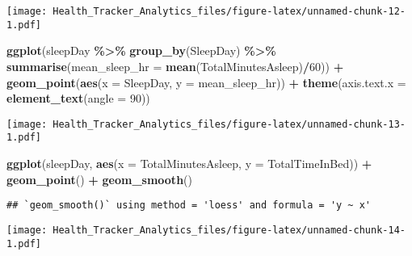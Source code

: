 \documentclass[
]{article}
\newenvironment{Shaded}{\begin{snugshade}}{\end{snugshade}}
\newcommand{\AttributeTok}[1]{\textcolor[rgb]{0.13,0.29,0.53}{#1}}
\newcommand{\DecValTok}[1]{\textcolor[rgb]{0.00,0.00,0.81}{#1}}
\newcommand{\FunctionTok}[1]{\textcolor[rgb]{0.13,0.29,0.53}{\textbf{#1}}}
\newcommand{\NormalTok}[1]{#1}
\newcommand{\SpecialCharTok}[1]{\textcolor[rgb]{0.81,0.36,0.00}{\textbf{#1}}}
\begin{document}
\texttt{[image: Health\_Tracker\_Analytics\_files/figure-latex/unnamed-chunk-12-1.pdf]}

\begin{Shaded}
\begin{Highlighting}[]
\FunctionTok{ggplot}\NormalTok{(sleepDay }\SpecialCharTok{\%\textgreater{}\%} \FunctionTok{group\_by}\NormalTok{(SleepDay) }\SpecialCharTok{\%\textgreater{}\%} \FunctionTok{summarise}\NormalTok{(}\AttributeTok{mean\_sleep\_hr =} \FunctionTok{mean}\NormalTok{(TotalMinutesAsleep)}\SpecialCharTok{/}\DecValTok{60}\NormalTok{)) }\SpecialCharTok{+} 
  \FunctionTok{geom\_point}\NormalTok{(}\FunctionTok{aes}\NormalTok{(}\AttributeTok{x =}\NormalTok{ SleepDay, }\AttributeTok{y =}\NormalTok{ mean\_sleep\_hr)) }\SpecialCharTok{+} 
  \FunctionTok{theme}\NormalTok{(}\AttributeTok{axis.text.x =} \FunctionTok{element\_text}\NormalTok{(}\AttributeTok{angle =} \DecValTok{90}\NormalTok{))}
\end{Highlighting}
\end{Shaded}

\texttt{[image: Health\_Tracker\_Analytics\_files/figure-latex/unnamed-chunk-13-1.pdf]}

\begin{Shaded}
\begin{Highlighting}[]
\FunctionTok{ggplot}\NormalTok{(sleepDay, }\FunctionTok{aes}\NormalTok{(}\AttributeTok{x =}\NormalTok{ TotalMinutesAsleep, }\AttributeTok{y =}\NormalTok{ TotalTimeInBed)) }\SpecialCharTok{+} 
  \FunctionTok{geom\_point}\NormalTok{() }\SpecialCharTok{+} \FunctionTok{geom\_smooth}\NormalTok{()}
\end{Highlighting}
\end{Shaded}

\begin{verbatim}
## `geom_smooth()` using method = 'loess' and formula = 'y ~ x'
\end{verbatim}

\texttt{[image: Health\_Tracker\_Analytics\_files/figure-latex/unnamed-chunk-14-1.pdf]}
\end{document}
